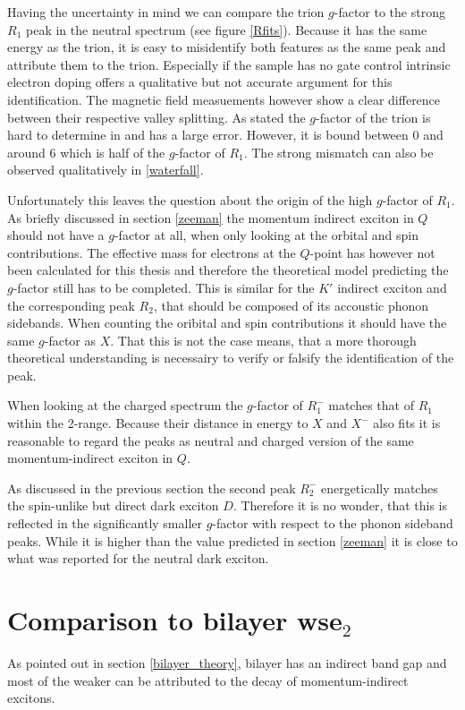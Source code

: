 Having the uncertainty in mind we can compare the trion $g$-factor to the strong $R_1$ peak in the neutral spectrum (see figure \ref{Rfits}). Because it has the same energy as the trion, it is easy to misidentify both features as the same peak and attribute them to the trion. Especially if the sample has no gate control intrinsic electron doping offers a qualitative but not accurate argument for this identification. The magnetic field measuements however show a clear difference between their respective valley splitting. As stated the $g$-factor of the trion is hard to determine in \pl and has a large error. However, it is bound between 0 and around 6 which is half of the $g$-factor of $R_1$. The strong mismatch can also be observed qualitatively in \ref{waterfall}.

Unfortunately this leaves the question about the origin of the high $g$-factor of $R_1$. As briefly discussed in section \ref{zeeman} the momentum indirect exciton in $Q$ should not have a $g$-factor at all, when only looking at the orbital and spin contributions. The effective mass for electrons at the $Q$-point has however not been calculated for this thesis and therefore the theoretical model predicting the $g$-factor still has to be completed. This is similar for the $K'$ indirect exciton and the corresponding peak $R_2$, that should be composed of its accoustic phonon sidebands. When counting the oribital and spin contributions it should have the same $g$-factor as $X$. That this is not the case means, that a more thorough theoretical understanding is necessairy to verify or falsify the identification of the peak.

When looking at the charged spectrum the $g$-factor of $R_1^-$ matches that of $R_1$ within the 2\sigma-range. Because their distance in energy to $X$ and $X^-$ also fits it is reasonable to regard the peaks as neutral and charged version of the same momentum-indirect exciton in $Q$.

As discussed in the previous section the second peak $R_2^-$ energetically matches the spin-unlike but direct dark exciton $D$. Therefore it is no wonder, that this is reflected in the significantly smaller $g$-factor with respect to the phonon sideband peaks. While it is higher than the value predicted in section \ref{zeeman} it is close to what was reported for the neutral dark exciton\cite{robert_fine_2017}.

\section{Comparison to bilayer ws\textup{e}$_2$}

As pointed out in section \ref{bilayer_theory}, bilayer \wse has an indirect band gap and most of the weaker \pl can be attributed to the decay of momentum-indirect excitons.
